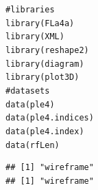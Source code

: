 \documentclass[a4paper,english,10pt]{article}\usepackage[]{graphicx}\usepackage[]{color}
\makeatletter
\newcommand{\hlcom}[1]{\textcolor[rgb]{0.2,0.267,0.4}{#1}}%
\newcommand{\hlstd}[1]{\textcolor[rgb]{0,0,0}{#1}}%
\newcommand{\hlkwd}[1]{\textcolor[rgb]{0.361,0.506,0.596}{#1}}%
\newenvironment{kframe}{%
 \def\at@end@of@kframe{}%
 \ifinner\ifhmode%
  \def\at@end@of@kframe{\end{minipage}}%
  \begin{minipage}{\columnwidth}%
 \fi\fi%
 \def\FrameCommand##1{\hskip\@totalleftmargin \hskip-\fboxsep
 \colorbox{shadecolor}{##1}\hskip-\fboxsep
     \hskip-\linewidth \hskip-\@totalleftmargin \hskip\columnwidth}%
 \MakeFramed {\advance\hsize-\width
   \@totalleftmargin\z@ \linewidth\hsize
   \@setminipage}}%
 {\par\unskip\endMakeFramed%
 \at@end@of@kframe}
\newenvironment{knitrout}{}{} %
\makeatother
\begin{document}
\begin{knitrout}
\color{fgcolor}\begin{kframe}
\begin{alltt}
\hlcom{# libraries}
\hlkwd{library}\hlstd{(FLa4a)}
\hlkwd{library}\hlstd{(XML)}
\hlkwd{library}\hlstd{(reshape2)}
\hlkwd{library}\hlstd{(diagram)}
\hlkwd{library}\hlstd{(plot3D)}
\hlcom{# datasets}
\hlkwd{data}\hlstd{(ple4)}
\hlkwd{data}\hlstd{(ple4.indices)}
\hlkwd{data}\hlstd{(ple4.index)}
\hlkwd{data}\hlstd{(rfLen)}
\end{alltt}
\end{kframe}
\end{knitrout}

\begin{knitrout}
\color{fgcolor}\begin{kframe}
\begin{verbatim}
## [1] "wireframe"
## [1] "wireframe"
\end{verbatim}
\end{kframe}
\end{knitrout}
\end{document}
